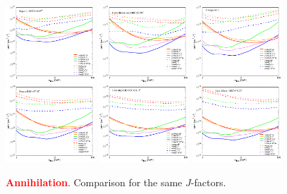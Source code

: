 \documentclass[aps,prd,amsmath,amssymb,showpacs,floats,floatfix,nofootinbib,reprint]{revtex4-1}
\def\red#1{{\textcolor{red}{#1}}} %
\begin{document}
\begin{figure}%
\caption{\red{\bf Annihilation}. Comparison for the same $J$-factors.}
{\includegraphics[width=0.3\textwidth]{comparison_segue1-hawc-ani.eps}}
{\includegraphics[width=0.3\textwidth]{comparison_comab-hawc-ani.eps}}
{\includegraphics[width=0.3\textwidth]{comparison_trian2-hawc-ani.eps}}
{\includegraphics[width=0.3\textwidth]{comparison_draco-hawc-ani.eps}}
{\includegraphics[width=0.3\textwidth]{comparison_urmajor2-hawc-ani.eps}}
{\includegraphics[width=0.3\textwidth]{comparison_urminor-hawc-ani.eps}}
\end{figure}
\end{document}

